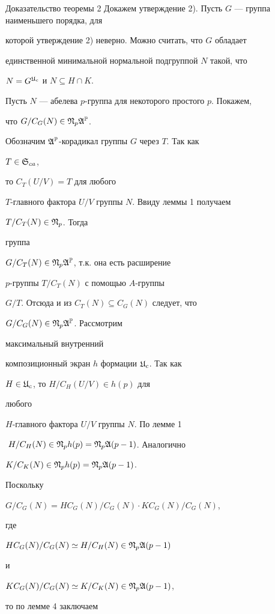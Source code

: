\begin{pf*}{Доказательство теоремы 2}
Докажем утверждение 2). Пусть $G$ --- группа наименьшего порядка, для


которой утверждение 2) неверно. Можно считать, что $G$ обладает


единственной минимальной нормальной подгруппой $N$ такой, что


$N=G^{\frak U_c}$ и $N\subseteq H\cap K$.





Пусть $N$ --- абелева $p$-группа для некоторого простого $p$. Покажем,


что $G/C_G(N)\in\frak N_p\frak A^{\Bbb P}$.


Обозначим $\frak A^{\Bbb P}$-корадикал группы $G$ через $T$. Так как


$T\in\frak S_{ca}$,


то $C_T(U/V)=T$ для любого


$T$-главного фактора $U/V$ группы $N$. Ввиду леммы 1 получаем


$T/C_T(N)\in\frak N_p$. Тогда


группа


$G/C_T(N)\in\frak N_p\frak A^{\Bbb P}$, т.к. она есть расширение


$p$-группы $T/C_T(N)$ с помощью $A$-группы


$G/T$. Отсюда и из $C_T(N)\subseteq C_G(N)$ следует, что


$G/C_G(N)\in\frak N_p\frak A^{\Bbb P}$. Рассмотрим


максимальный внутренний


композиционный экран $h$ формации $\frak U_c$. Так как


$H\in\frak U_c$, то $H/C_H(U/V)\in h(p)$ для


любого


$H$-главного фактора $U/V$ группы $N$. По лемме 1


$\;H/C_H(N)\in\frak N_ph(p)=\frak N_p\frak A(p-1)$. Аналогично


$K/C_K(N)\in\frak N_ph(p)=\frak N_p\frak A(p-1)$.


Поскольку


$G/C_G(N)=HC_G(N)/C_G(N)\cdot KC_G(N)/C_G(N)$,


где


$HC_G(N)/C_G(N)\simeq H/C_H(N)\in\frak N_p\frak A(p-1)$


и


$KC_G(N)/C_G(N)\simeq K/C_K(N)\in\frak N_p\frak A(p-1)$,


то по лемме 4 заключаем



\end{pf*}
